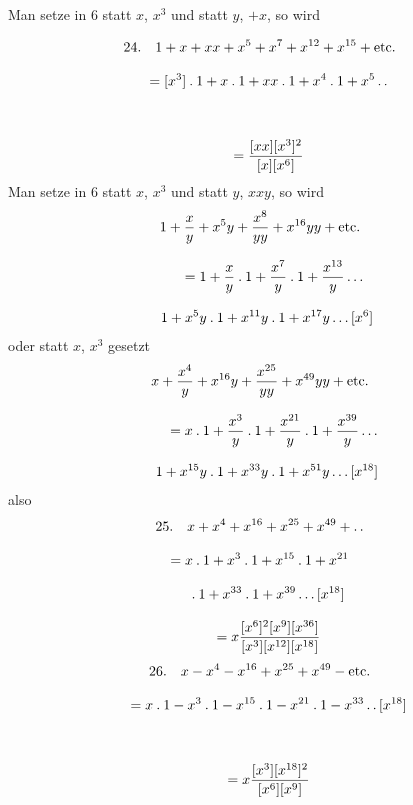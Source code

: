 Man setze in 6 statt $x$, $x^3$ und statt $y$, $+x$, so wird

\[
\begin{gathered}
24.\quad 1+x+xx+x^{5}+x^{7}+x^{12}+x^{15}+\mathrm{etc.}
 \\[8pt]\quad{}= [x^{3}]\mathbin{.}1+x\mathbin{.}1+xx\mathbin{.}1+x^{4}\mathbin{.}1+x^{5}\mathinner{.\,.}\\[8pt]
 \\[8pt]\quad{}=\frac{[xx][x^{3}]^{2}}{[x][x^{6}]}
\end{gathered}
\]
Man setze in 6 statt $x$, $x^{3}$ und statt $y$, $xxy$, so wird
\[
\begin{gathered}
1+\frac{x}{y}+x^{5}y+\frac{x^{8}}{yy}+x^{16}yy+\mathrm{etc.}\\[8pt]
\qquad=1+\frac{x}{y}\mathbin{.}1+\frac{x^{7}}{y}\mathbin{.}1+\frac{x^{13}}{y}\mathinner{.\,.\,.}
  \\[8pt]\quad{}1+x^{5}y\mathbin{.}1+x^{11}y\mathbin{.}1+x^{17}y\mathinner{.\,.\,.}[x^{6}]
\end{gathered}
\]
oder statt $x$, $x^{3}$ gesetzt
\[
\begin{gathered}
x+\frac{x^{4}}{y}+x^{16}y+\frac{x^{25}}{yy}+x^{49}yy+\mathrm{etc.}\\[8pt]
\qquad=x\mathbin{.}1+\frac{x^{3}}{y}\mathbin{.}1+\frac{x^{21}}{y}\mathbin{.}1+\frac{x^{39}}{y}\mathinner{.\,.\,.}
  \\[8pt]\quad{}1+x^{15}y\mathbin{.}1+x^{33}y\mathbin{.}1+x^{51}y\mathinner{.\,.\,.}[x^{18}]
\end{gathered}
\]
also
\[
\begin{gathered}
25.\quad x+x^{4}+x^{16}+x^{25}+x^{49}+\mathinner{.\,.}\\[8pt]
 =x\mathbin{.}1+x^{3}\mathbin{.}1+x^{15}\mathbin{.}1+x^{21}\\[8pt]\quad{}\mathbin{.}1+x^{33}\mathbin{.}1+x^{39}\mathinner{.\,.\,.}[x^{18}]
 \\[8pt]\quad{}=x\frac{[x^{6}]^{2}[x^{9}][x^{36}]}{[x^{3}][x^{12}][x^{18}]}
\end{gathered}
\]
\[
\begin{gathered}
26.\quad x-x^{4}-x^{16}+x^{25}+x^{49}-\mathrm{etc.}
 \\[8pt]\quad{}=x\mathbin{.}1-x^{3}\mathbin{.}1-x^{15}\mathbin{.}1-x^{21}\mathbin{.}1-x^{33}\mathinner{.\,.}[x^{18}]\\[8pt]
 \\[8pt]\quad{}=x\frac{[x^{3}][x^{18}]^{2}}{[x^{6}][x^{9}]}
\end{gathered}
\]
